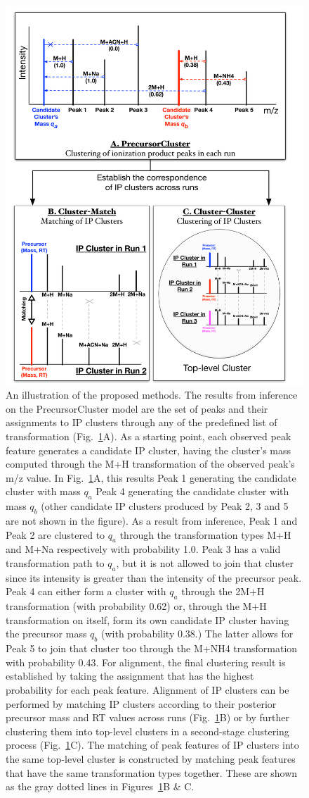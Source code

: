 \begin{figure}[!htbp]
\centering
\includegraphics[width=0.5\linewidth]{05-precursor-cluster/figures/fig1.pdf}
\caption{\label{fig:01} An illustration of the proposed methods. The results from inference on the PrecursorCluster model are the set of peaks and their assignments to IP clusters through any of the predefined list of transformation (Fig.~\ref{fig:01}A). As a starting point, each observed peak feature generates a candidate IP cluster, having the cluster's mass computed through the M+H transformation of the observed peak's m/z value. In Fig.~\ref{fig:01}A, this results Peak 1 generating the candidate cluster with mass $q_a$ Peak 4 generating the candidate cluster with mass $q_b$ (other candidate IP clusters produced by Peak 2, 3 and 5 are not shown in the figure). As a result from inference, Peak 1 and Peak 2 are clustered to $q_a$ through the transformation types M+H and M+Na respectively with probability 1.0. Peak 3 has a valid transformation path to $q_a$, but it is not allowed to join that cluster since its intensity is greater than the intensity of the precursor peak. Peak 4 can either form a cluster with $q_a$ through the 2M+H transformation (with probability 0.62) or, through the M+H transformation on itself, form its own candidate IP cluster having the precursor mass $q_b$ (with probability 0.38.) The latter allows for Peak 5 to join that cluster too through the M+NH4 transformation with probability 0.43. For alignment, the final clustering result is established by taking the assignment that has the highest probability for each peak feature. Alignment of IP clusters can be performed by matching IP clusters according to their posterior precursor mass and RT values across runs (Fig.~\ref{fig:01}B) or by further clustering them into top-level clusters in a second-stage clustering process (Fig.~\ref{fig:01}C). The matching of peak features of IP clusters into the same top-level cluster is constructed by matching peak features that have the same transformation types together. These are shown as the gray dotted lines in Figures~\ref{fig:01}B \& C.}
\end{figure}


